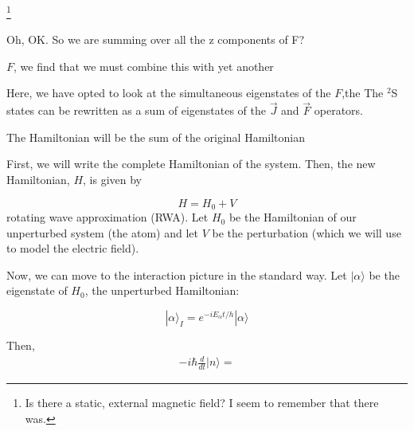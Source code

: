\footnote{Is there a static, external magnetic field? I seem to remember that there was.}





Oh, OK. So we are summing over all the z components of F?


$F$, we find that we must combine this with yet another 

Here, we have opted to look at the simultaneous eigenstates of the $F$,the The $^2$S states can be rewritten as a sum of eigenstates of the $\vec{J}$ and $\vec{F}$ operators. 


The Hamiltonian will be the sum of the original Hamiltonian 

First, we will write the complete Hamiltonian of the system.
Then, the new Hamiltonian, $H$, is given by 

\begin{equation}
H=H_0+V
\end{equation}
rotating wave approximation (RWA). Let $H_0$ be the Hamiltonian of our unperturbed system (the atom) and let $V$ be the perturbation (which we will use to model the electric field). 

Now, we can move to the interaction picture in the standard way. Let $|\alpha\rangle$ be the eigenstate of $H_0$, the unperturbed Hamiltonian: 

\begin{equation}
|\alpha\rangle_I=e^{-iE_\alpha t/h}|\alpha\rangle
\end{equation}

Then, 
\begin{align}
-i\hbar \frac{d}{dt}|n\rangle = 
\end{align}

